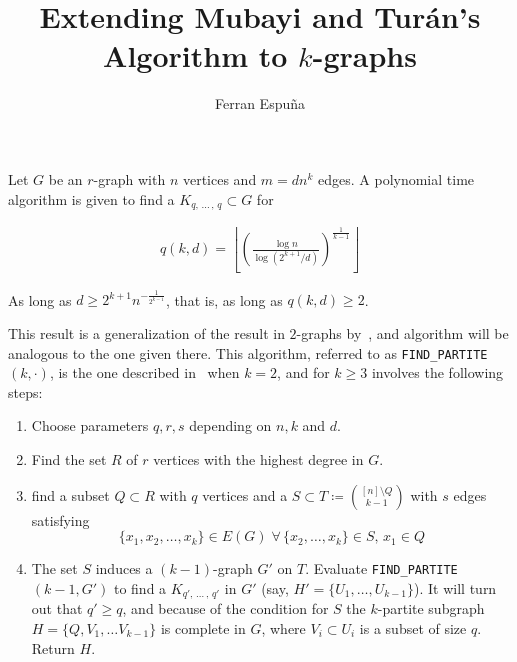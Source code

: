 \documentclass[12pt]{article}
\author{Ferran Espuña}
\date{} %
\begin{document}
    \title{Extending Mubayi and Turán's Algorithm to $k$-graphs}

    \maketitle

    Let $G$ be an $r$-graph with $n$ vertices and $m = dn^k$ edges.
    A polynomial time algorithm is given to find a $K_{q,\, \ldots\, ,\, q} \subset G$ for

    \begin{align*}
        q (k, d) = \left\lfloor \left(  \frac{\log n}{\log (2^{k+1}/d)} \right)^{\frac{1}{k-1}} \right\rfloor
        \label{eq:q}
    \end{align*}

    As long as $d \geq 2^{k+1} n^{-\frac{1}{2^{k-1}}}$, that is, as long as $q(k, d) \geq 2$.

    This result is a generalization of the result in $2$-graphs by~\cite{MUBAYI2010174},
    and algorithm will be analogous to the one given there.
    This algorithm, referred to as \verb|FIND_PARTITE|$(k, \cdot)$,
    is the one described in~\cite{MUBAYI2010174}
    when $k=2$, and for $k \geq 3$ involves the following steps:

    \begin{enumerate}
        \item Choose parameters $q, r, s$ depending on $n, k$ and $d$. \label{step:choose_parameters}

        \item Find the set $R$ of $r$ vertices with the highest degree in $G$. \label{step:find_R}

        \item find a subset $Q \subset R$ with $q$ vertices and a
        $S \subset T \coloneqq \binom{[n] \setminus Q}{k-1}$ with $s$ edges satisfying
        \[\{x_1, x_2, \ldots, x_k\} \in E(G) \; \forall \, \{x_2, \ldots, x_k\} \in S, \, x_1 \in Q\] \label{step:find_Q_S}

        \item The set $S$ induces a $(k-1)$-graph $G'$ on $T$.
        Evaluate \verb|FIND_PARTITE|$(k-1, G')$ to find a $K_{q',\, \ldots\, ,\, q'}$ in $G'$
        (say, $H' = \{U_1, \ldots, U_{k-1}\}$). It will turn out that $q' \geq q$,
        and because of the condition for $S$ the $k$-partite subgraph $H = \{Q, V_1, \ldots V_{k-1}\}$
        is complete in $G$, where $V_i \subset U_i$ is a subset of size $q$.
        Return $H$.

    \end{enumerate}
\end{document}
